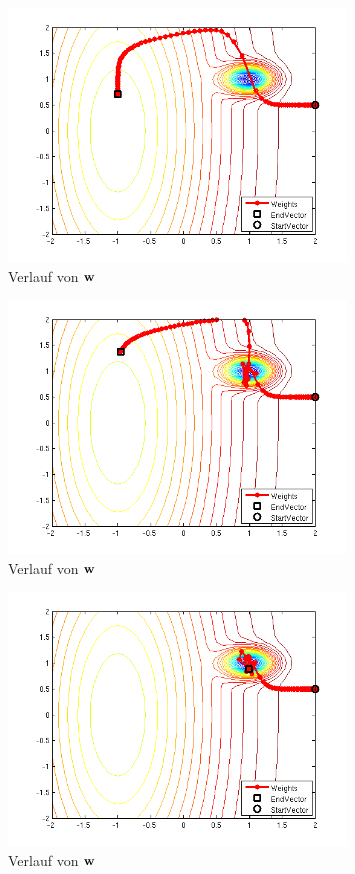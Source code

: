 \begin{figure}[h!]
  \centering
  \includegraphics[width=0.8\textwidth]{./figures/212/path_w01_eta02.png}
  \caption{Verlauf von $\mathbf{w}$}
  \label{fig:impulse_path_w01_eta02}
\end{figure}

\begin{figure}[h!]
  \centering
  \includegraphics[width=0.8\textwidth]{./figures/212/path_w01_eta015.png}
  \caption{Verlauf von $\mathbf{w}$}
  \label{fig:impulse_path_w01_eta015}
\end{figure}

\begin{figure}[h!]
  \centering
  \includegraphics[width=0.8\textwidth]{./figures/212/path_w01_eta01.png}
  \caption{Verlauf von $\mathbf{w}$}
  \label{fig:impulse_path_w01_eta01}
\end{figure}

